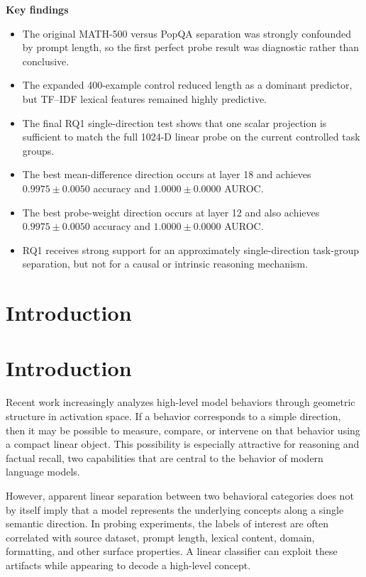 \documentclass[11pt]{article}
\begin{document}
\begin{highlightbox}
\textbf{Key findings}

\begin{itemize}[leftmargin=*]
    \item The original MATH-500 versus PopQA separation was strongly confounded by prompt length, so the first perfect probe result was diagnostic rather than conclusive.
    \item The expanded 400-example control reduced length as a dominant predictor, but TF--IDF lexical features remained highly predictive.
    \item The final RQ1 single-direction test shows that one scalar projection is sufficient to match the full 1024-D linear probe on the current controlled task groups.
    \item The best mean-difference direction occurs at layer 18 and achieves \(0.9975 \pm 0.0050\) accuracy and \(1.0000 \pm 0.0000\) AUROC.
    \item The best probe-weight direction occurs at layer 12 and also achieves \(0.9975 \pm 0.0050\) accuracy and \(1.0000 \pm 0.0000\) AUROC.
    \item RQ1 receives strong support for an approximately single-direction task-group separation, but not for a causal or intrinsic reasoning mechanism.
\end{itemize}

\end{highlightbox}

\section{Introduction}\section{Introduction}

Recent work increasingly analyzes high-level model behaviors through
geometric structure in activation space. If a behavior corresponds to
a simple direction, then it may be possible to measure, compare, or
intervene on that behavior using a compact linear object. This
possibility is especially attractive for reasoning and factual recall,
two capabilities that are central to the behavior of modern language
models.

However, apparent linear separation between two behavioral categories
does not by itself imply that a model represents the underlying
concepts along a single semantic direction. In probing experiments,
the labels of interest are often correlated with source dataset,
prompt length, lexical content, domain, formatting, and other surface
properties. A linear classifier can exploit these artifacts while
appearing to decode a high-level concept.
\end{document}
